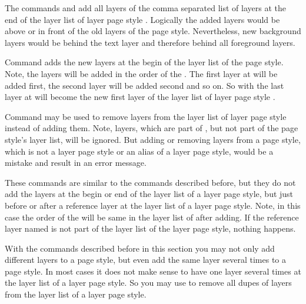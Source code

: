 The commands  and 
add all layers of the comma separated list of layers  at
the end of the layer list of layer page style . Logically the added layers would be above or in front of the old
layers of the page style. Nevertheless, new background layers would be behind
the text layer and therefore behind all foreground layers.

Command  adds the new layers at the begin
of the layer list of the page style. Note, the layers
will be added in the order of the . The first layer at
 will be added first, the second layer will be added second
and so on. So with  the last layer at
 will become the new first layer of the layer list of layer
page style .

Command  may be used to remove layers from
the layer list of layer page style  instead of adding
them. Note, layers, which are part of , but not part of
the page style's layer list, will be ignored. But adding or removing layers
from a page style, which is not a layer page style or an alias of a layer page
style, would be a mistake and result in an error message.%
\EndIndexGroup


\begin{Declaration}
\end{Declaration}
These commands are similar to the commands described before, but they do not
add the layers at the begin or end of the layer list of a layer page style,
but just before or after a reference layer at the layer list of a layer page
style. Note, in this case the order of the  will be
same in the layer list of  after adding. If the
reference layer named  is not part of the layer
list of the layer page style, nothing happens.%
\EndIndexGroup


\begin{Declaration}
\end{Declaration}
With the commands described before in this section you may not only add
different layers to a page style, but even add the same layer several times to
a page style. In most cases it does not make sense to have one layer several
times at the layer list of a layer page style. So you may use
 to remove all dupes of layers from the layer
list of a layer page style. 

